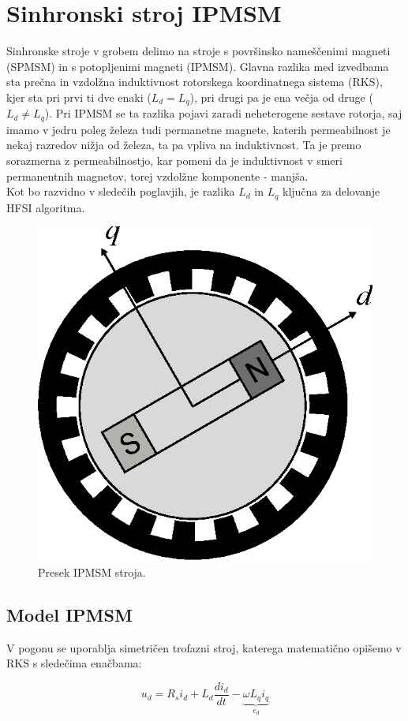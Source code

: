 \documentclass[a4paper,twoside,openright,12pt,slovene]{book}
\begin{document}

\chapter{Sinhronski stroj IPMSM} \label{sinhronskiStroj}

Sinhronske stroje v grobem delimo na stroje s površinsko nameščenimi magneti (SPMSM) in s potopljenimi magneti (IPMSM). Glavna razlika med izvedbama sta prečna in vzdolžna induktivnost rotorskega
koordinatnega sistema (RKS), kjer sta pri prvi ti dve enaki ($L_d = L_q$), pri drugi pa je ena večja od druge ($L_d \neq L_q$). Pri IPMSM se ta razlika pojavi zaradi neheterogene sestave rotorja, saj
imamo v jedru poleg železa tudi permanetne magnete, katerih permeabilnost je nekaj razredov nižja od železa, ta pa vpliva na induktivnost. Ta je premo sorazmerna z permeabilnostjo, kar pomeni da je
induktivnost v smeri permanentnih magnetov, torej vzdolžne komponente - manjša. 
\\
Kot bo razvidno v sledečih poglavjih, je razlika $L_d$ in $L_q$ ključna za delovanje HFSI algoritma. 

\begin{figure}[!htbp]
    \centering
    \includegraphics[width=0.5\columnwidth]{Slike/Inkscape/IPMSMsimple.eps}
    \caption{\label{IPMSM} Presek IPMSM stroja.}
\end{figure}


\section{Model IPMSM} \label{motor}

V pogonu se uporablja simetričen trofazni stroj, katerega matematično opišemo v RKS s sledečima enačbama:

\begin{equation} \label{motorModelD}
    u_d = R_si_d+L_d\frac{di_d}{dt}-\underbrace{\omega L_qi_q}_{e_d}
\end{equation}
\end{document}
